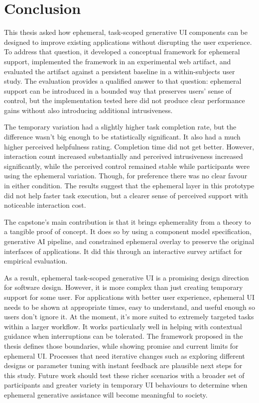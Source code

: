 \pagestyle{fancy} 
\section{Conclusion}

This thesis asked how ephemeral, task-scoped generative UI components can be designed to improve existing applications without disrupting the user experience. To address that question, it developed a conceptual framework for ephemeral support, implemented the framework in an experimental web artifact, and evaluated the artifact against a persistent baseline in a within-subjects user study. The evaluation provides a qualified answer to that question: ephemeral support can be introduced in a bounded way that preserves users' sense of control, but the implementation tested here did not produce clear performance gains without also introducing additional intrusiveness.

The temporary variation had a slightly higher task completion rate, but the difference wasn't big enough to be statistically significant. It also had a much higher perceived helpfulness rating. Completion time did not get better. However, interaction count increased substantially and perceived intrusiveness increased significantly, while the perceived control remained stable while participants were using the ephemeral variation. Though, for preference there was no clear favour in either condition. The results suggest that the ephemeral layer in this prototype did not help faster task execution, but a clearer sense of perceived support with noticeable interaction cost.

The capstone's main contribution is that it brings ephemerality from a theory to a tangible proof of concept. It does so by using a component model specification, generative AI pipeline, and constrained ephemeral overlay to preserve the original interfaces of applications. It did this through an interactive survey artifact for empirical evaluation.

As a result, ephemeral task-scoped generative UI is a promising design direction for software design. However, it is more complex than just creating temporary support for some user. For applications with better user experience, ephemeral UI needs to be shown at appropriate times, easy to understand, and useful enough so users don't ignore it. At the moment, it's more suited to extremely targeted tasks within a larger workflow. It works particularly well in helping with contextual guidance when interruptions can be tolerated. The framework proposed in the thesis defines those boundaries, while showing promise and current limits for ephemeral UI. Processes that need iterative changes such as exploring different designs or parameter tuning with instant feedback are plausible next steps for this study. Future work should test these richer scenarios with a broader set of participants and greater variety in temporary UI behaviours to determine when ephemeral generative assistance will become meaningful to society. 

